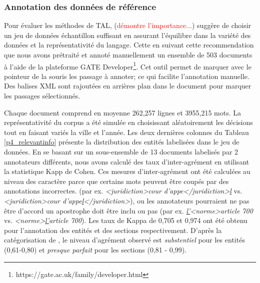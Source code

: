 \subsubsection{Annotation des données de référence}
Pour évaluer les méthodes de TAL, \citet{xiao2010corpuscreation} (\textcolor{red}{démontre l'importance...}) suggère de choisir un jeu de données échantillon suffisant en assurant l'équilibre dans la variété des données et la représentativité du langage. Cette en suivant cette recommendation que nous avons prétraité et annoté manuellement un ensemble de 503 documents à l'aide de la plateforme GATE Developer\footnote{https://gate.ac.uk/family/developer.html}. Cet outil permet de marquer avec le pointeur de la souris les passage à annoter; ce qui facilite l'annotation manuelle. Des balises XML sont rajoutées en arrières plan dans le document pour marquer les passages sélectionnés.

Chaque document comprend en moyenne 262,257 lignes et 3955,215 mots. La représentativité du corpus a été simulée en choisissant aléatoirement les décisions tout en faisant variés la ville et l'année. Les deux dernières colonnes du Tableau \ref{p4_relevantinfo} présente la distribution des entités labelisées dans le jeu de données. En se basant sur un sous-ensemble de 13 documents labelisés par 2 annotateurs différents, nous avons calculé des taux d'inter-agrément en utilisant la statistique Kapp de Cohen. Ces mesures d'inter-agrément ont été calculées au niveau des caractère parce que certains mots peuvent être coupés par des annotations incorrectes. (par ex. \textit{<juridiction>cour d'appe</juridiction>\underline{l}} vs. \textit{<juridiction>cour d'appe\underline{l}</juridiction>}), ou les annotateurs pourraient ne pas être d'accord un apostrophe doit être inclu ou pas (par ex. \textit{ \underline{l'}<norme>article 700} vs. \textit{ <norme>\underline{l'}article 700}). Les taux de Kappa de 0,705 et 0,974 ont été obtenu pour l'annotation des entités et des sections respectivement. D'après la catégorisation de \citet{viera2005kappa}, le niveau d'agrément observé est \textit{substentiel} pour les entités (0,61-0,80) et \textit{presque parfait} pour les sections (0,81 - 0,99).

